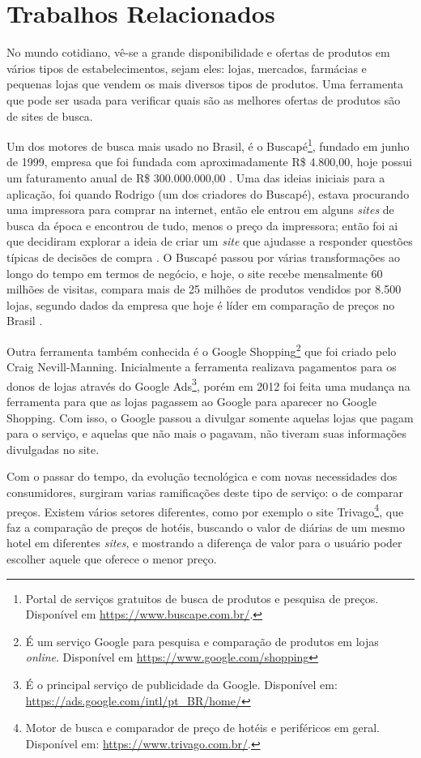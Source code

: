 \section{Trabalhos Relacionados}
\label{sec:trabalhos-relacionados}

No mundo cotidiano, vê-se a grande disponibilidade e ofertas de produtos em vários tipos de estabelecimentos, sejam eles: lojas, mercados, farmácias e pequenas lojas que vendem os mais diversos tipos de produtos. Uma ferramenta que pode ser usada para verificar quais são as melhores ofertas de produtos são de sites de busca.

Um dos motores de busca mais usado no Brasil, é o Buscapé\footnote{Portal de serviços gratuitos de busca de produtos e pesquisa de preços. Disponível em \url{https://www.buscape.com.br/}.}, fundado em junho de 1999, empresa que foi fundada com aproximadamente R\$ 4.800,00, hoje possui um faturamento anual de R\$ 300.000.000,00 \cite{EmídiaFelipe2017BUSCAPÉ}. Uma das ideias iniciais para a aplicação, foi quando Rodrigo (um dos criadores do Buscapé), estava procurando uma impressora para comprar na internet, então ele entrou em alguns \textit{sites} de busca da época e encontrou de tudo, menos o preço da impressora; então foi ai que decidiram explorar a ideia de criar um \textit{site} que ajudasse a responder questões típicas de decisões de compra \cite{Arruda2011Buscapé}. O Buscapé passou por várias transformações ao longo do tempo em termos de negócio, e hoje, o site recebe mensalmente 60 milhões de visitas, compara mais de 25 milhões de produtos vendidos por 8.500 lojas, segundo dados da empresa que hoje é líder em comparação de preços no Brasil \cite{Heloísa2017Startups}.

Outra ferramenta também conhecida é o Google Shopping\footnote{É um serviço Google para pesquisa e comparação de produtos em lojas \textit{online}. Disponível em \url{https://www.google.com/shopping}} que foi criado pelo Craig Nevill-Manning. Inicialmente a ferramenta realizava pagamentos para os donos de lojas através do Google Ads\footnote{É o principal serviço de publicidade da Google. Disponível em: \url{https://ads.google.com/intl/pt_BR/home/}}, porém em 2012 foi feita uma mudança na ferramenta para que as lojas pagassem ao Google para aparecer no Google Shopping. Com isso, o Google passou a divulgar somente aquelas lojas que pagam para o serviço, e aquelas que não mais o pagavam, não tiveram suas informações divulgadas no site.

Com o passar do tempo, da evolução tecnológica e com novas necessidades dos consumidores, surgiram varias ramificações deste tipo de serviço: o de comparar preços. Existem vários setores diferentes, como por exemplo o site Trivago\footnote{Motor de busca e comparador de preço de hotéis e periféricos em geral. Disponível em: \url{https://www.trivago.com.br/}.}, que faz a comparação de preços de hotéis, buscando o valor de diárias de um mesmo hotel em diferentes \textit{sites}, e mostrando a diferença de valor para o usuário poder escolher aquele que oferece o menor preço.

